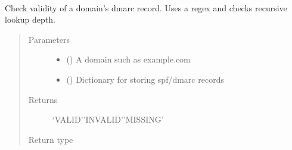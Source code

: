 \documentclass[a4paper,10pt,english,openany,oneside]{sphinxmanual}
\begin{document}
\begin{fulllineitems}
\label{\detokenize{functions:sdvalidator.validate_dmarc}}~
\begin{sphinxVerbatim}[commandchars=\\\{\}]
\end{sphinxVerbatim}

Check validity of a domain’s dmarc record.
Uses a regex and checks recursive lookup depth.
\begin{quote}\begin{description}
\item[{Parameters}] \leavevmode\begin{itemize}
\item {} 
 () \textendash{} A domain such as example.com

\item {} 
 () \textendash{} Dictionary for storing spf/dmarc records

\end{itemize}

\item[{Returns}] \leavevmode
‘VALID’\textbar{}’INVALID’\textbar{}’MISSING’

\item[{Return type}] \leavevmode
{}

\end{description}\end{quote}

\end{fulllineitems}

\end{document}
